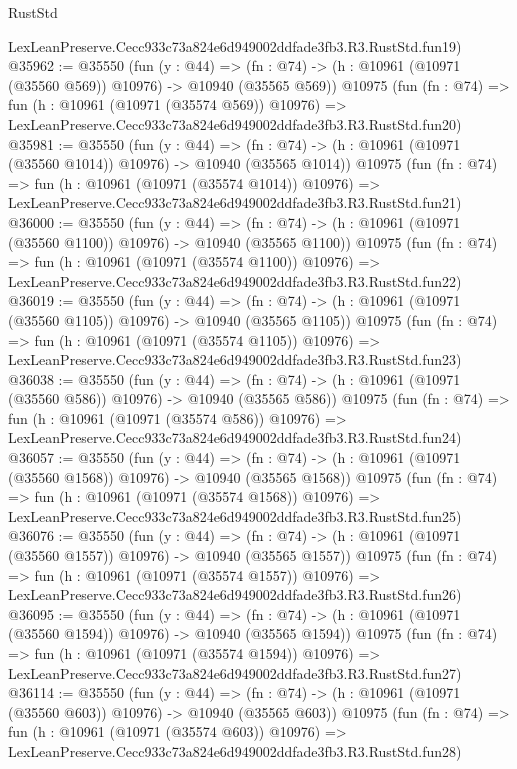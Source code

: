 \begin{lexlean}{RustStd}
\begin{coremodule}
    LexLeanPreserve.Cecc933c73a824e6d949002ddfade3fb3.R3.RustStd.fun19)
@35962 := @35550
    (fun (y : @44) =>
    (fn : @74) -> (h : @10961 (@10971 (@35560 @569)) @10976) -> @10940 (@35565 @569))
    @10975
    (fun (fn : @74) =>
    fun (h : @10961 (@10971 (@35574 @569)) @10976) =>
    LexLeanPreserve.Cecc933c73a824e6d949002ddfade3fb3.R3.RustStd.fun20)
@35981 := @35550
    (fun (y : @44) =>
    (fn : @74) -> (h : @10961 (@10971 (@35560 @1014)) @10976) -> @10940 (@35565 @1014))
    @10975
    (fun (fn : @74) =>
    fun (h : @10961 (@10971 (@35574 @1014)) @10976) =>
    LexLeanPreserve.Cecc933c73a824e6d949002ddfade3fb3.R3.RustStd.fun21)
@36000 := @35550
    (fun (y : @44) =>
    (fn : @74) -> (h : @10961 (@10971 (@35560 @1100)) @10976) -> @10940 (@35565 @1100))
    @10975
    (fun (fn : @74) =>
    fun (h : @10961 (@10971 (@35574 @1100)) @10976) =>
    LexLeanPreserve.Cecc933c73a824e6d949002ddfade3fb3.R3.RustStd.fun22)
@36019 := @35550
    (fun (y : @44) =>
    (fn : @74) -> (h : @10961 (@10971 (@35560 @1105)) @10976) -> @10940 (@35565 @1105))
    @10975
    (fun (fn : @74) =>
    fun (h : @10961 (@10971 (@35574 @1105)) @10976) =>
    LexLeanPreserve.Cecc933c73a824e6d949002ddfade3fb3.R3.RustStd.fun23)
@36038 := @35550
    (fun (y : @44) =>
    (fn : @74) -> (h : @10961 (@10971 (@35560 @586)) @10976) -> @10940 (@35565 @586))
    @10975
    (fun (fn : @74) =>
    fun (h : @10961 (@10971 (@35574 @586)) @10976) =>
    LexLeanPreserve.Cecc933c73a824e6d949002ddfade3fb3.R3.RustStd.fun24)
@36057 := @35550
    (fun (y : @44) =>
    (fn : @74) -> (h : @10961 (@10971 (@35560 @1568)) @10976) -> @10940 (@35565 @1568))
    @10975
    (fun (fn : @74) =>
    fun (h : @10961 (@10971 (@35574 @1568)) @10976) =>
    LexLeanPreserve.Cecc933c73a824e6d949002ddfade3fb3.R3.RustStd.fun25)
@36076 := @35550
    (fun (y : @44) =>
    (fn : @74) -> (h : @10961 (@10971 (@35560 @1557)) @10976) -> @10940 (@35565 @1557))
    @10975
    (fun (fn : @74) =>
    fun (h : @10961 (@10971 (@35574 @1557)) @10976) =>
    LexLeanPreserve.Cecc933c73a824e6d949002ddfade3fb3.R3.RustStd.fun26)
@36095 := @35550
    (fun (y : @44) =>
    (fn : @74) -> (h : @10961 (@10971 (@35560 @1594)) @10976) -> @10940 (@35565 @1594))
    @10975
    (fun (fn : @74) =>
    fun (h : @10961 (@10971 (@35574 @1594)) @10976) =>
    LexLeanPreserve.Cecc933c73a824e6d949002ddfade3fb3.R3.RustStd.fun27)
@36114 := @35550
    (fun (y : @44) =>
    (fn : @74) -> (h : @10961 (@10971 (@35560 @603)) @10976) -> @10940 (@35565 @603))
    @10975
    (fun (fn : @74) =>
    fun (h : @10961 (@10971 (@35574 @603)) @10976) =>
    LexLeanPreserve.Cecc933c73a824e6d949002ddfade3fb3.R3.RustStd.fun28)

\end{coremodule}
\end{lexlean}
